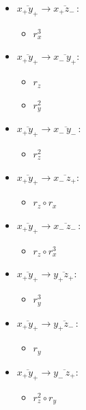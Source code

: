 \begin{enumerate}[(a)]
\begin{enumerate}[(i)]
\begin{multicols}{3}
\begin{itemize}
	 	\item
	 	$\overline{x_+y_+} \rightarrow \overline{x_+z_-\,}$: 
	 		\begin{itemize}
	 		\item
	 		$r_x^3$
	 		\end{itemize}
	 		
	 	\item
	 	$\overline{x_+y_+} \rightarrow \overline{x_-\,y_+}$: 
	 		\begin{itemize}
	 		\item
	 		$r_z$
	 		
	 		\item
	 		$r_y^2$
	 		\end{itemize}
	 		
	 	\item
	 	$\overline{x_+y_+} \rightarrow \overline{x_-\,y_-\,}$: 
	 		\begin{itemize}
	 		\item
	 		$r_z^2$
	 		\end{itemize}
	 	
	 \item
	 	$\overline{x_+y_+} \rightarrow \overline{x_-\,z_+}$: 
	 		\begin{itemize}
	 		\item
	 		$r_z \circ r_x$
	 		\end{itemize}
	 		
	 	\item
	 	$\overline{x_+y_+} \rightarrow \overline{x_-\,z_-\,}$: 
	 		\begin{itemize}
	 		\item
	 		$r_z \circ r_x^3$
	 		\end{itemize}
	 		
	 	\item
	 	$\overline{x_+y_+} \rightarrow \overline{y_+z_+}$: 
	 		\begin{itemize}
	 		\item
	 		$r_y^3$
	 		\end{itemize}
	 		
	 	\item
	 	$\overline{x_+y_+} \rightarrow \overline{y_+z_-\,}$: 
	 		\begin{itemize}
	 		\item
	 		$r_y$
	 		\end{itemize}
	 		
	 	\item
	 	$\overline{x_+y_+} \rightarrow \overline{y_-\,z_+}$: 
	 		\begin{itemize}
	 		\item
	 		$r_z^2 \circ r_y$
	 		\end{itemize}
	 		

\end{itemize}
\end{multicols}
\end{enumerate}
\end{enumerate}

